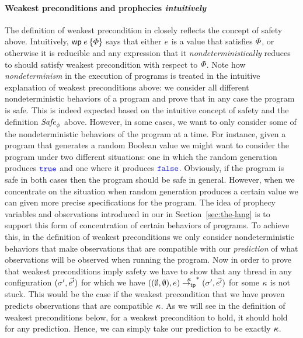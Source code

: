 \documentclass{article}
\begin{document}
\paragraph{Weakest preconditions and prophecies \emph{intuitively}}
The definition of weakest precondition in \Iris{} closely reflects the
concept of safety above. Intuitively, $\wpre{\expr}{\pred}$ says that
either $e$ is a value that satisfies $\varPhi$, or otherwise it is
reducible and any expression that it \emph{nondeterministically}
reduces to should satisfy weakest precondition with respect to
$\varPhi$. Note how \emph{nondeterminism} in the execution of programs
is treated in the intuitive explanation of weakest preconditions
above: we consider all different nondeterministic behaviors of a
program and prove that in any case the program is safe. This is indeed
expected based on the intuitive concept of safety and the definition
$\mathit{Safe}_{\phi}$ above. However, in some cases, we want to only
consider some of the nondeterministic behaviors of the program at a
time. For instance, given a program that generates a random Boolean
value we might want to consider the program under two different
situations: one in which the random generation produces $\textnormal{\texttt{\color{blue} true}}$ and
one where it produces $\textnormal{\texttt{\color{blue} false}}$. Obviously, if the program is safe in
both cases then the program should be safe in general. However, when
we concentrate on the situation when random generation produces a
certain value we can given more precise specifications for the
program. The idea of prophecy variables and observations introduced in
our \TheLang{} in Section~\ref{sec:the-lang} is to support this form
of concentration of certain behaviors of programs. To achieve this, in
the definition of weakest preconditions we only consider
nondeterministic behaviors that make observations that are compatible
with our \emph{prediction} of what observations will be observed when
running the program. Now in order to prove that weakest preconditions
imply safety we have to show that any thread in any configuration
$(\sigma', \vec{e'})$ for which we have
$((\emptyset, \emptyset), e) \overset{\kappa}{\rightarrow_{\mathsf{tp}}}^*
(\sigma', \vec{e'})$ for some $\kappa$ is not stuck. This
would be the case if the weakest precondition that we have proven
predicts observations that are compatible $\kappa$. As we will
see in the definition of weakest preconditions below, for a weakest
precondition to hold, it should hold for any prediction. Hence, we can
simply take our prediction to be exactly $\kappa$.
\end{document}
